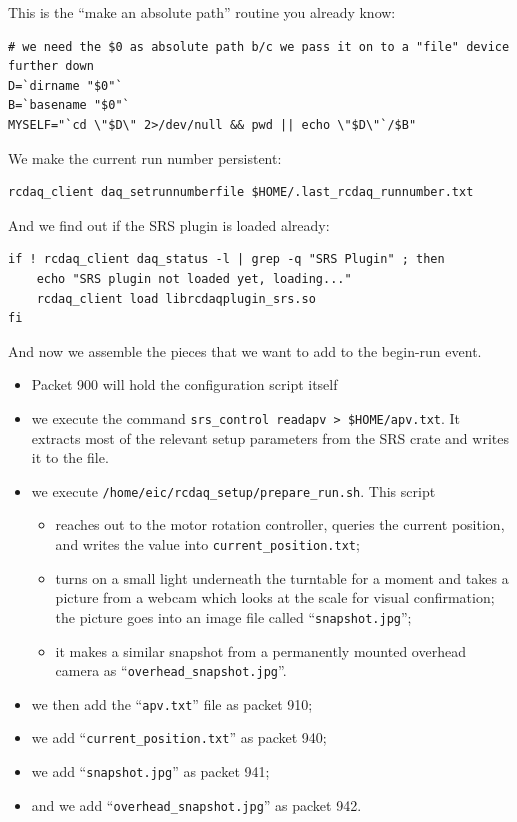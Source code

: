 \documentclass{article}[11pt]
\begin{document}
This is the ``make an absolute path'' routine you already know:

\begin{verbatim} 
# we need the $0 as absolute path b/c we pass it on to a "file" device further down
D=`dirname "$0"`
B=`basename "$0"`
MYSELF="`cd \"$D\" 2>/dev/null && pwd || echo \"$D\"`/$B"
\end{verbatim} 

We make the current run number persistent:

\begin{verbatim} 
rcdaq_client daq_setrunnumberfile $HOME/.last_rcdaq_runnumber.txt
\end{verbatim} 

And we find out if the SRS plugin is loaded already:

\begin{verbatim} 
if ! rcdaq_client daq_status -l | grep -q "SRS Plugin" ; then
    echo "SRS plugin not loaded yet, loading..."
    rcdaq_client load librcdaqplugin_srs.so
fi
\end{verbatim} 


And now we assemble the pieces that we want to add to the begin-run event. 
\begin{itemize}
\item Packet 900 will hold the configuration script itself
\item we execute the command \verb|srs_control readapv > $HOME/apv.txt|. It extracts 
most of the relevant setup parameters from the SRS crate and writes it to the file.
\item we execute  \verb|/home/eic/rcdaq_setup/prepare_run.sh|. This script 

\begin{itemize} 
\item reaches out to the motor rotation controller, queries the current
  position, and writes the value into \verb|current_position.txt|;
\item turns on a small light underneath the turntable for a moment and
 takes a picture from a webcam which looks at the scale for visual confirmation; the picture goes into an image file called
``\verb|snapshot.jpg|'';
\item it makes a similar snapshot from a permanently mounted overhead camera as ``\verb|overhead_snapshot.jpg|''.
\end{itemize}

\item we then add the ``\verb|apv.txt|'' file as packet 910;
\item we add ``\verb|current_position.txt|'' as packet 940; 
\item we add ``\verb|snapshot.jpg|'' as packet 941;
\item and we add ``\verb|overhead_snapshot.jpg|'' as packet 942.
\end{itemize}
\end{document}
